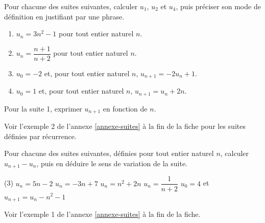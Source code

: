 \documentclass[10pt,a4paper]{article}
\begin{document}
\begin{bloc}
\begin{exo}
Pour chacune des suites suivantes, calculer \(u_1\), \(u_2\) et \(u_4\), puis préciser son mode de définition en justifiant par une phrase.
\begin{enumerate}[leftmargin=*]
    \item \(u_n=3n^2-1\) pour tout entier naturel \(n\).
    \item \(u_n=\dfrac{n+1}{n+2}\) pour tout entier naturel \(n\).
    \item \(u_0=-2\) et, pour tout entier naturel \(n\), \(u_{n+1}=-2u_n+1\).
    \item[\(\star\)~4.] \(u_0=1\) et, pour tout entier naturel \(n\), \(u_{n+1}=u_n+2n\).
\end{enumerate}
Pour la suite 1, exprimer \(u_{n+1}\) en fonction de \(n\).
\end{exo}

\begin{indication}
    Voir l'exemple 2 de l'annexe \ref{annexe-suites} à la fin de la fiche pour les suites définies par récurrence.
\end{indication}
\end{bloc}

\begin{bloc}
\begin{exo}
Pour chacune des suites suivantes, définies pour tout entier naturel \(n\), calculer \(u_{n+1}-u_n\), puis en déduire le sens de variation de la suite.
\begin{tasks}(3)
    \task \(u_n=5n-2\)
    \task \(u_n=-3n+7\)
    \task \(u_n=n^2+2n\)
    \task \(u_n=\dfrac{1}{n+2}\)
    \task \(u_0=4\) et \(u_{n+1}=u_n-n^2-1\)
\end{tasks}
\end{exo}

\begin{indication}
    Voir l'exemple 1 de l'annexe \ref{annexe-suites} à la fin de la fiche.
\end{indication}
\end{bloc}
\end{document}
